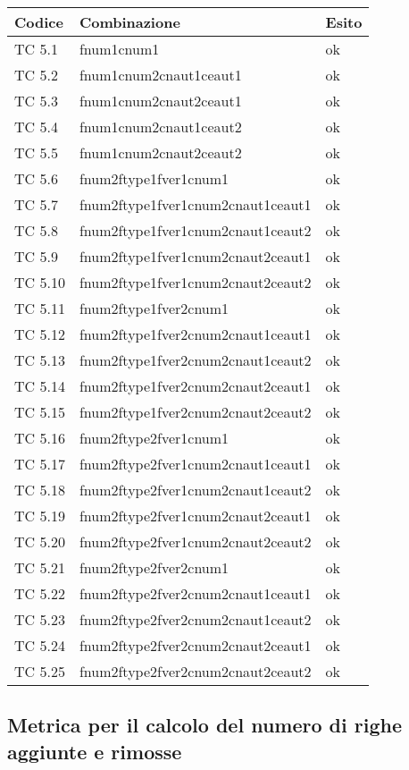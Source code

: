 \begin{tabular}{|p{3cm}|p{7cm}|p{3cm}|}
	\hline
	\rowcolor{Gray}
	\textbf{Codice} & \textbf{Combinazione} & \textbf{Esito}\tabularnewline
	\hline
	TC 5.1			& fnum1cnum1						& ok \tabularnewline
	\hline
	TC 5.2			& fnum1cnum2cnaut1ceaut1			& ok \tabularnewline
	\hline
	TC 5.3			& fnum1cnum2cnaut2ceaut1			& ok \tabularnewline
	\hline
	TC 5.4			& fnum1cnum2cnaut1ceaut2			& ok \tabularnewline
	\hline
	TC 5.5			& fnum1cnum2cnaut2ceaut2			& ok \tabularnewline
	\hline
	TC 5.6			& fnum2ftype1fver1cnum1				& ok \tabularnewline
	\hline
	TC 5.7			& fnum2ftype1fver1cnum2cnaut1ceaut1	& ok \tabularnewline
	\hline
	TC 5.8			& fnum2ftype1fver1cnum2cnaut1ceaut2	& ok \tabularnewline
	\hline
	TC 5.9			& fnum2ftype1fver1cnum2cnaut2ceaut1	& ok \tabularnewline
	\hline
	TC 5.10			& fnum2ftype1fver1cnum2cnaut2ceaut2	& ok \tabularnewline
	\hline
	TC 5.11			& fnum2ftype1fver2cnum1			& ok \tabularnewline
	\hline
	TC 5.12			& fnum2ftype1fver2cnum2cnaut1ceaut1	& ok \tabularnewline
	\hline
	TC 5.13			& fnum2ftype1fver2cnum2cnaut1ceaut2	& ok \tabularnewline
	\hline
	TC 5.14			& fnum2ftype1fver2cnum2cnaut2ceaut1	& ok \tabularnewline
	\hline
	TC 5.15			& fnum2ftype1fver2cnum2cnaut2ceaut2	& ok \tabularnewline
	\hline
	TC 5.16			& fnum2ftype2fver1cnum1			& ok \tabularnewline
	\hline
	TC 5.17			& fnum2ftype2fver1cnum2cnaut1ceaut1	& ok \tabularnewline
	\hline
	TC 5.18			& fnum2ftype2fver1cnum2cnaut1ceaut2	& ok \tabularnewline
	\hline
	TC 5.19			& fnum2ftype2fver1cnum2cnaut2ceaut1	& ok \tabularnewline
	\hline
	TC 5.20			& fnum2ftype2fver1cnum2cnaut2ceaut2	& ok \tabularnewline
	\hline
	TC 5.21			& fnum2ftype2fver2cnum1				& ok \tabularnewline
	\hline
	TC 5.22			& fnum2ftype2fver2cnum2cnaut1ceaut1	& ok \tabularnewline
	\hline
	TC 5.23			& fnum2ftype2fver2cnum2cnaut1ceaut2	& ok \tabularnewline
	\hline
	TC 5.24			& fnum2ftype2fver2cnum2cnaut2ceaut1	& ok \tabularnewline
	\hline
	TC 5.25			& fnum2ftype2fver2cnum2cnaut2ceaut2	& ok \tabularnewline
	\hline
\end{tabular}
\clearpage




\subsection{Metrica per il calcolo del numero di righe aggiunte e rimosse}

